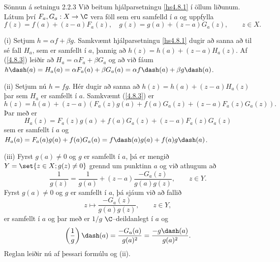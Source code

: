 \begin{sotx}{Sönnun á setningu 2.2.3}   Við beitum hjálparsetningu
\ref{hs4.8.1}
 í öllum  liðunum.
Látum því $F_a,G_a:X\to \C$ vera föll sem eru samfelld í $a$ og uppfylla
\begin{equation}
f(z)=f(a)+(z-a)F_a(z), \quad g(z)=g(a)+(z-a)G_a(z), \qquad z\in X.
\label{4.8.3}
\end{equation}

(i) Setjum $h=\alpha f+\beta g$.  Samkvæmt hjálparsetningu
\ref{hs4.8.1}
dugir að sanna að til sé fall $H_a$, sem er samfellt í $a$, þannig að
$h(z)=h(a)+(z-a)H_a(z)$.  Af (\ref{4.8.3}) leiðir að 
$H_a=\alpha F_a+\beta G_a$ og að við fáum $h\dash(a)=H_a(a)=\alpha F_a(a)+\beta
G_a(a)=\alpha f\dash(a)+\beta g\dash(a)$. 

(ii)  Setjum nú $h=fg$.  Hér dugir að sanna að
$h(z)=h(a)+(z-a)H_a(z)$
þar sem $H_a$ er samfellt í $a$.  Samkvæmt (\ref{4.8.3}) er
 $$h(z)=h(a)+(z-a)\left(F_a(z)g(a)+f(a)G_a(z)+(z-a)F_a(z)G_a(z)\right).
 $$
Þar með er 
 $$H_a(z)=F_a(z)g(a)+f(a)G_a(z)+(z-a)F_a(z)G_a(z)
 $$
sem er samfellt í $a$ og
$H_a(a)=F_a(a)g(a)+f(a)G_a(a)=f\dash(a)g(a)+f(a)g\dash(a)$. 

(iii)  Fyrst $g(a)\neq 0$ og $g$ er samfellt í $a$, þá er 
mengið $Y=\set{z\in X; g(z)\neq 0}$ grennd um punktinn $a$
og við athugum að 
 $$\dfrac 1{g(z)} =\dfrac 1{g(a)}+(z-a)\dfrac {-G_a(z)}{g(a)g(z)}, \qquad
z\in Y.  
 $$
Fyrst $g(a)\neq 0$ og $g$ er samfellt í $a$, þá 
sjáum við að fallið
 $$z\mapsto \dfrac {-G_a(z)}{g(a)g(z)}, \qquad z\in Y,
 $$
er samfellt í $a$ og þar með er $1/g$ $\C$--deildanlegt í $a$ og
 $$\left(\dfrac 1g\right)\dash(a)= \dfrac{-G_a(a)}{g(a)^2} =
\dfrac {-g\dash(a)}{g(a)\sp 2}.
 $$
Reglan leiðir nú af þessari formúlu og (ii).
\end{sotx}


